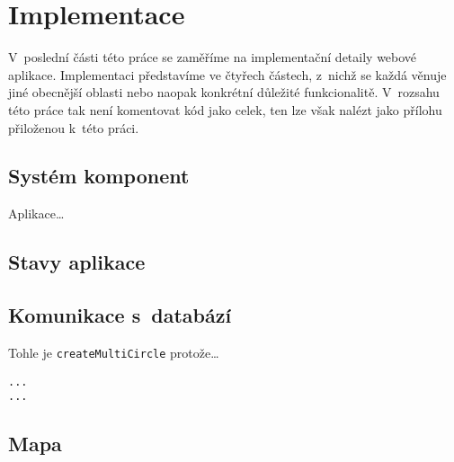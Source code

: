 \hypertarget{implementace}{%
\chapter{Implementace}\label{implementace}}

V~poslední části této práce se zaměříme na implementační detaily webové aplikace. Implementaci představíme ve čtyřech částech, z~nichž se každá věnuje jiné obecnější oblasti nebo naopak konkrétní důležité funkcionalitě. V~rozsahu této práce tak není komentovat kód jako celek, ten lze však nalézt jako přílohu přiloženou k~této práci.

\hypertarget{systuxe9m-komponent}{%
\section{Systém komponent}\label{systuxe9m-komponent}}

Aplikace\ldots{}


\hypertarget{stavy-aplikace}{%
\section{Stavy aplikace}\label{stavy-aplikace}}

\hypertarget{komunikace-s-databuxe1zuxed}{%
\section{Komunikace s~databází}\label{komunikace-s-databuxe1zuxed}}

Tohle je \verb|createMultiCircle| protože\ldots{}

\begin{verbatim}
...
...
\end{verbatim}

\hypertarget{mapa}{%
\section{Mapa}\label{mapa}}
